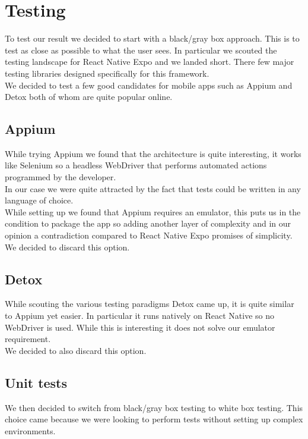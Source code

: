 \documentclass[10pt]{article}
\begin{document}
    \section{Testing}
    To test our result we decided to start with a black/gray box approach. This is to test as close as possible to what the user sees. In particular we scouted the testing landscape for React Native Expo and we landed short. There few major testing libraries designed specifically for this framework. \\
    We decided to test a few good candidates for mobile apps such as Appium and Detox both of whom are quite popular online.
    \subsection{Appium}
    While trying Appium we found that the architecture is quite interesting, it works like Selenium so a headless WebDriver that performs automated actions programmed by the developer. \\
    In our case we were quite attracted by the fact that tests could be written in any language of choice. \\
    While setting up we found that Appium requires an emulator, this puts us in the condition to package the app so adding another layer of complexity and in our opinion a contradiction compared to React Native Expo promises of simplicity. \\
    We decided to discard this option.
    \subsection{Detox}
    While scouting the various testing paradigms Detox came up, it is quite similar to Appium yet easier. In particular it runs natively on React Native so no WebDriver is used. While this is interesting it does not solve our emulator requirement. \\
    We decided to also discard this option.
    \subsection{Unit tests}
    We then decided to switch from black/gray box testing to white box testing. This choice came because we were looking to perform tests without setting up complex environments.
\end{document}
